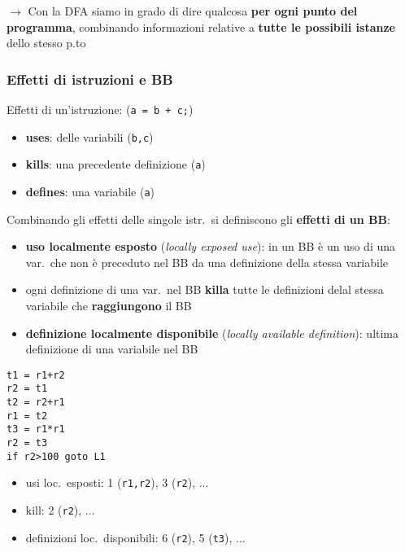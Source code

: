 \noindent $\rightarrow$ Con la DFA siamo in grado di dire qualcosa \textbf{per ogni punto del programma}, combinando informazioni relative a \textbf{tutte le possibili istanze} dello stesso p.to

\subsubsection{Effetti di istruzioni e BB}

Effetti di un'istruzione: (\lstinline|a = b + c;|)
\begin{itemize}
  \item \textbf{uses}: delle variabili (\lstinline|b,c|)
  \item \textbf{kills}: una precedente definizione (\lstinline|a|)
  \item \textbf{defines}: una variabile (\lstinline|a|)
\end{itemize}
Combinando gli effetti delle singole istr.~si definiscono gli \textbf{effetti di un BB}:
\begin{itemize}
  \item \textbf{uso localmente esposto} (\textit{locally exposed use}): in un BB \`e un uso di una var.~che non \`e preceduto nel BB da una definizione della stessa variabile
  \item ogni definizione di una var.~nel BB \textbf{killa} tutte le definizioni delal stessa variabile che \textbf{raggiungono} il BB
  \item \textbf{definizione localmente disponibile} (\textit{locally available definition}): ultima definizione di una variabile nel BB
\end{itemize}

\newpage
\begin{example}
\noindent \begin{minipage}[c]{.45\textwidth}
    \begin{lstlisting}[numbers=right,numbersep=-10pt]
t1 = r1+r2
r2 = t1
t2 = r2+r1
r1 = t2
t3 = r1*r1
r2 = t3
if r2>100 goto L1\end{lstlisting}
\end{minipage}\hfill
\begin{minipage}[c]{.55\textwidth}
\begin{itemize}
  \item usi loc.~esposti: 1 (\lstinline|r1,r2|), 3 (\lstinline|r2|), ...
  \item kill: 2 (\lstinline|r2|), ...
  \item definizioni loc.~disponibili: 6 (\lstinline|r2|), 5 (\lstinline|t3|), ...
\end{itemize}
\end{minipage}
\end{example}

